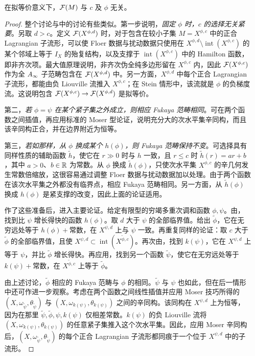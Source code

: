 \begin{proposition}\label{st:19.4}
在拟等价意义下，$\mathcal F(M)$ 与 $c$ 及 $\phi$ 无关。
\end{proposition}
\begin{proof}
整个讨论与中的讨论有些类似。第一步说明，\emph{固定 $\phi$ 时，$c$ 的选择无关紧要}。另取 $d>c$。定义 $\mathcal F(X^{\phi,d})$ 时，对于包含在较小子集 $M=X^{\phi,c}$ 中的正合 Lagrangian 子流形，可以使 Floer 数据与扰动数据只使用在 $X^{\phi,d}\setminus\operatorname{int}(X^{\phi,c})$ 的某个邻域上等于 $I_X$ 的殆复结构，以及支撑于 $\operatorname{int}(X^{\phi,c})$ 中的 Hamilton 函数，即非齐次项。最大值原理说明，非齐次伪全纯多边形留在 $X^{\phi,c}$ 内，因此 $\mathcal F(X^{\phi,c})$ 作为全 $A_\infty$ 子范畴包含在 $\mathcal F(X^{\phi,d})$ 中。另一方面，$X^{\phi,d}$ 中每个正合 Lagrangian 子流形，都能由负 Liouville 流推入 $X^{\phi,c}$；在 Stein 情形中，该流就是 $\phi$ 的负梯度流。这说明包含 $\mathcal F(X^{\phi,c})\to\mathcal F(X^{\phi,d})$ 是拟等价。

第二，\emph{若 $\phi=\psi$ 在某个紧子集之外成立，则相应 Fukaya 范畴相同}。可在两个函数之间插值，再应用标准的 Moser 型论证，说明充分大的次水平集辛同构，而且该辛同构正合，并在边界附近为恒等。

第三，\emph{若如那样，从 $\phi$ 换成某个 $h(\phi)$，则 Fukaya 范畴保持不变}。可选择具有同样性质的辅助函数 $\widetilde h$，使它在 $r\gg0$ 时与 $h$ 一致，且 $r\le c$ 时 $\widetilde h(r)=ar+b$，其中 $a>0$、$b\in\mathbb R$ 为常数。从 $\phi$ 换成 $\widetilde h(\phi)$，只使次水平集 $X^{\phi,c}$ 的辛几何发生常数倍缩放，这很容易通过调整 Floer 数据与扰动数据加以处理。由于两个函数在该次水平集之外都没有临界点，相应 Fukaya 范畴相同。另一方面，从 $\widetilde h(\phi)$ 换成 $h(\phi)$ 是紧支撑的改变，因此上面的论证适用。

作了这些准备后，进入主要论证。给定有限型的穷竭多重次调和函数 $\phi,\psi$。由，找到比 $\psi$ 增长得快的函数 $h(\phi)$。取 $d$ 大于 $\psi$ 的全部临界值。给出 $\widetilde\phi$，它在无穷远处等于 $h(\phi)+\text{常数}$，在 $X^{\psi,d}$ 上与 $\psi$ 一致。再重复同样的论证：取 $c$ 大于 $\widetilde\phi$ 的全部临界值，且使 $X^{\psi,d}\subset\operatorname{int}(X^{\widetilde\phi,c})$。再次由，找到 $k(\psi)$，它在 $X^{\psi,d}$ 上等于 $\psi$，并比 $\widetilde\phi$ 增长得快。再应用，找到另一个函数 $\widetilde\psi$，使它在无穷远处等于 $k(\psi)+\text{常数}$，在 $X^{\widetilde\phi,c}$ 上等于 $\widetilde\phi$。

由上述讨论，$\widetilde\phi$ 相应的 Fukaya 范畴与 $\phi$ 的相同。$\widetilde\psi$ 与 $\psi$ 也如此，但在后一情形中还可作进一步观察。考虑在两个函数之间线性插值并应用 Moser 技巧所得的 $(X,\omega_{\widetilde\psi},\theta_{\widetilde\psi})$ 与 $(X,\omega_{k(\psi)},\theta_{k(\psi)})$ 之间的辛同构。该同构在 $X^{\psi,d}$ 上为恒等，因为在那里 $\widetilde\psi,\widetilde\phi,\psi,k(\psi)$ 仅相差常数。$k(\psi)$ 的负 Liouville 流将 $(X,\omega_{k(\psi)},\theta_{k(\psi)})$ 的任意紧子集推入这个次水平集。因此，应用 Moser 辛同构后，$(X,\omega_{\widetilde\psi},\theta_{\widetilde\psi})$ 的每个正合 Lagrangian 子流形都同痕于一个位于 $X^{\psi,d}$ 中的子流形。


\end{proof}
